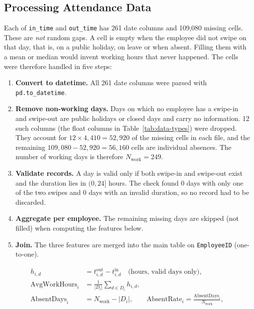 \documentclass[12pt,a4paper]{article}
\begin{document}
\subsection{Processing Attendance Data}
\label{sec:attendance}

Each of \texttt{in\_time} and \texttt{out\_time} has 261 date columns and
109,080 missing cells. These are \emph{not} random gaps. A cell is empty when
the employee did not swipe on that day, that is, on a public holiday, on leave
or when absent. Filling them with a mean or median would invent working hours
that never happened. The cells were therefore handled in five steps:

\begin{enumerate}[label=\textbf{Step \arabic*.}, leftmargin=*]
  \item \textbf{Convert to datetime.} All 261 date columns were parsed
  with \texttt{pd.to\_datetime}.

  \item \textbf{Remove non-working days.} Days on which no employee has a
  swipe-in and swipe-out are public holidays or closed days and carry no
  information. 12 such columns (the float columns in
  Table~\ref{tab:data-types}) were dropped. They account for
  $12 \times 4{,}410 = 52{,}920$ of the missing cells in each file, and the
  remaining $109{,}080 - 52{,}920 = 56{,}160$ cells are individual absences.
  The number of working days is therefore $N_{\text{work}} = 249$.

  \item \textbf{Validate records.} A day is valid only if both swipe-in
  and swipe-out exist and the duration lies in $(0, 24]$ hours. The check
  found 0 days with only one of the two swipes and 0 days with an invalid
  duration, so no record had to be discarded.

  \item \textbf{Aggregate per employee.} The remaining missing days are
  skipped (not filled) when computing the features below.

  \item \textbf{Join.} The three features are merged into the main table
  on \texttt{EmployeeID} (one-to-one).
\end{enumerate}

\begin{align}
  h_{i,d} &= t^{\text{out}}_{i,d} - t^{\text{in}}_{i,d}
  \quad\text{(hours, valid days only)},\\
  \text{AvgWorkHours}_i &= \frac{1}{|D_i|}\sum_{d\in D_i} h_{i,d},\\
  \text{AbsentDays}_i &= N_{\text{work}} - |D_i|,\qquad
  \text{AbsentRate}_i = \frac{\text{AbsentDays}_i}{N_{\text{work}}},
\end{align}
\end{document}
